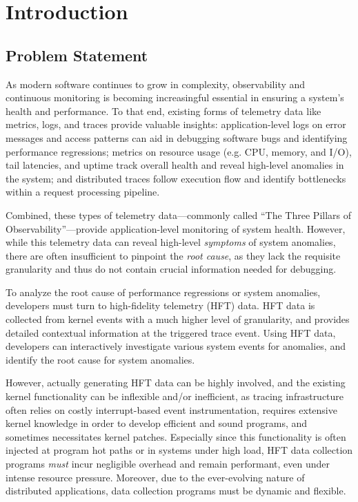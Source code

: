 \section{Introduction}

\subsection{Problem Statement}

As modern software continues to grow in complexity, observability and continuous monitoring is
becoming increasingful essential in ensuring a system's health and performance. To that end,
existing forms of telemetry data like metrics, logs, and traces provide valuable insights:
application-level logs on error messages and access patterns can aid in debugging software bugs and
identifying performance regressions; metrics on resource usage (e.g. CPU, memory, and I/O), tail
latencies, and uptime track overall health and reveal high-level anomalies in the system; and
distributed traces follow execution flow and identify bottlenecks within a request processing
pipeline.

Combined, these types of telemetry data---commonly called ``The Three Pillars of
Observability''---provide application-level monitoring of system health.  However, while this
telemetry data can reveal high-level \textit{symptoms} of system anomalies, there are often
insufficient to pinpoint the \textit{root cause}, as they lack the requisite granularity and thus do
not contain crucial information needed for debugging.

To analyze the root cause of performance regressions or system anomalies, developers must turn to
high-fidelity telemetry (HFT) data. HFT data is collected from kernel events with a much higher
level of granularity, and provides detailed contextual information at the triggered trace event.
Using HFT data, developers can interactively investigate various system events for anomalies, and
identify the root cause for system anomalies.

However, actually generating HFT data can be highly involved, and the existing kernel functionality
can be inflexible and/or inefficient, as tracing infrastructure often relies on costly
interrupt-based event instrumentation, requires extensive kernel knowledge in order to develop
efficient and sound programs, and sometimes necessitates kernel patches. Especially since this
functionality is often injected at program hot paths or in systems under high load, HFT data
collection programs \textit{must} incur negligible overhead and remain performant, even under
intense resource pressure. Moreover, due to the ever-evolving nature of distributed applications,
data collection programs must be dynamic and flexible.

